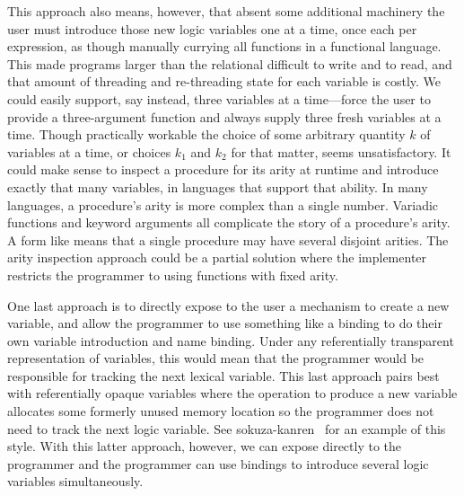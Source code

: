 \documentclass[sigplan,balance,pbalance,natbib=false]{acmart}
\begin{document}
This approach also means, however, that absent some additional
machinery the user must introduce those new logic variables one at a
time, once each per  expression, as though
manually currying all functions in a functional language. This made
programs larger than the relational  difficult to
write and to read, and that amount of threading and re-threading state
for each variable is costly. We could easily support, say instead,
three variables at a time---force the user to provide a three-argument
function and always supply three fresh variables at a time. Though
practically workable the choice of some arbitrary quantity $k$ of
variables at a time, or choices $k_{1}$ and $k_{2}$ for that matter,
seems unsatisfactory. It could make sense to inspect a procedure for
its arity at runtime and introduce exactly that many variables, in
languages that support that ability. In many languages, a procedure's
arity is more complex than a single number. Variadic functions and
keyword arguments all complicate the story of a procedure's arity. A
form like  means that a single procedure may
have several disjoint arities. The arity inspection approach could be
a partial solution where the implementer restricts the programmer to
using functions with fixed arity.

One last approach is to directly expose to the user a mechanism to
create a new variable, and allow the programmer to use something like
a  binding to do their own variable introduction and
name binding. Under any referentially transparent representation of
variables, this would mean that the programmer would be responsible
for tracking the next lexical variable. This last approach pairs best
with referentially opaque variables where the operation to produce a
new variable allocates some formerly unused memory location so the
programmer does not need to track the next logic variable. See
sokuza-kanren~\cite{kiselyov2006taste} for an example of this style.
With this latter approach, however, we can expose 
directly to the programmer and the programmer can use 
bindings to introduce several logic variables simultaneously.

\paragraph{}
\end{document}
